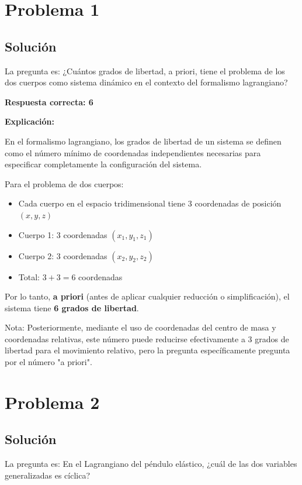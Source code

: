 \documentclass[a4paper]{article}
\begin{document}
\section{Problema 1}

\subsection{Solución}

La pregunta es: ¿Cuántos grados de libertad, a priori, tiene el problema de los dos cuerpos como sistema dinámico en el contexto del formalismo lagrangiano?

\textbf{Respuesta correcta: 6}

\textbf{Explicación:}

En el formalismo lagrangiano, los grados de libertad de un sistema se definen como el número mínimo de coordenadas independientes necesarias para especificar completamente la configuración del sistema.

Para el problema de dos cuerpos:
\begin{itemize}
    \item Cada cuerpo en el espacio tridimensional tiene 3 coordenadas de posición $(x, y, z)$
    \item Cuerpo 1: 3 coordenadas $(x_1, y_1, z_1)$
    \item Cuerpo 2: 3 coordenadas $(x_2, y_2, z_2)$
    \item Total: $3 + 3 = 6$ coordenadas
\end{itemize}

Por lo tanto, \textbf{a priori} (antes de aplicar cualquier reducción o simplificación), el sistema tiene \textbf{6 grados de libertad}.

Nota: Posteriormente, mediante el uso de coordenadas del centro de masa y coordenadas relativas, este número puede reducirse efectivamente a 3 grados de libertad para el movimiento relativo, pero la pregunta específicamente pregunta por el número "a priori".

\section{Problema 2}

\subsection{Solución}

La pregunta es: En el Lagrangiano del péndulo elástico, ¿cuál de las dos variables generalizadas es cíclica?
\end{document}
